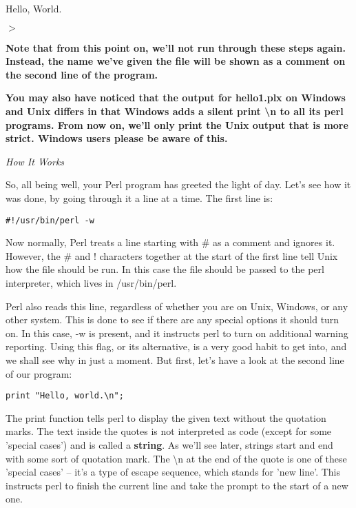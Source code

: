 \documentclass[a4paper,11pt]{book}
\begin{document}
\noindent Hello, World.

\noindent $>$

\noindent 

\noindent 

\noindent \textbf{Note that from this point on, we'll not run through these steps again. Instead, the name we've given the file will be shown as a comment on the second line of the program.}

\noindent 

\noindent \textbf{You may also have noticed that the output for hello1.plx on Windows and Unix differs in that Windows adds a silent print \textbackslash n to all its perl programs. From now on, we'll only print the Unix output that is more strict. Windows users please be aware of this.}

\noindent 

\noindent \textit{How It Works}

\noindent So, all being well, your Perl program has greeted the light of day. Let's see how it was done, by going through it a line at a time. The first line is:

\noindent 

\noindent \texttt{\#!/usr/bin/perl -w}

\noindent 

\noindent Now normally, Perl treats a line starting with \# as a comment and ignores it. However, the \# and ! characters together at the start of the first line tell Unix how the file should be run. In this case the file should be passed to the perl interpreter, which lives in /usr/bin/perl.

\noindent 

\noindent Perl also reads this line, regardless of whether you are on Unix, Windows, or any other system. This is done to see if there are any special options it should turn on. In this case, -w is present, and it instructs perl to turn on additional warning reporting. Using this flag, or its alternative, is a very good habit to get into, and we shall see why in just a moment. But first, let's have a look at the second line of our program:

\noindent 

\noindent \texttt{print "Hello, world.\textbackslash n";}

\noindent 

\noindent The print function tells perl to display the given text without the quotation marks. The text inside the quotes is not interpreted as code (except for some 'special cases') and is called a \textbf{string}. As we'll see later, strings start and end with some sort of quotation mark. The \textbackslash n at the end of the quote is one of these 'special cases' -- it's a type of escape sequence, which stands for 'new line'. This instructs perl to finish the current line and take the prompt to the start of a new one.
\end{document}
